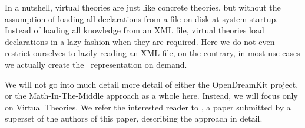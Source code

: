 In a nutshell, virtual theories are just like concrete theories, but without the assumption of loading all declarations from a file on disk at system startup. 
Instead of loading all knowledge from an XML file, virtual theories load declarations in a lazy fashion when they are required. 
Here we do not even restrict ourselves to lazily reading an XML file, on the contrary, in most use cases we actually create the \omdocmmt\ representation on demand. 

We will not go into much detail more detail of either the OpenDreamKit project, or the Math-In-The-Middle approach as a whole here. 
Instead, we will focus only on Virtual Theories. 
We refer the interested reader to , a paper submitted by a superset of the authors of this paper, describing the approach in detail. 


